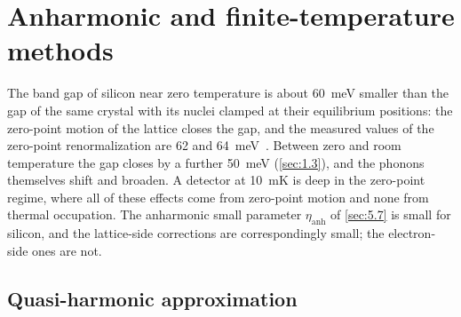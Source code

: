 \section{Anharmonic and finite-temperature methods}\label{app:E.8}

The band gap of silicon near zero temperature is about \SI{60}{meV} smaller than the gap of the same crystal with its nuclei clamped at their equilibrium positions: the zero-point motion of the lattice closes the gap, and the measured values of the zero-point renormalization are 62 and \SI{64}{meV}~\cite[Table~VI]{ponce2015temperature}. Between zero and room temperature the gap closes by a further \SI{50}{meV} (\cref{sec:1.3}), and the phonons themselves shift and broaden. A detector at \SI{10}{mK} is deep in the zero-point regime, where all of these effects come from zero-point motion and none from thermal occupation. The anharmonic small parameter $\eta_{\mathrm{anh}}$ of \cref{sec:5.7} is small for silicon, and the lattice-side corrections are correspondingly small; the electron-side ones are not.

\subsection{Quasi-harmonic approximation}

